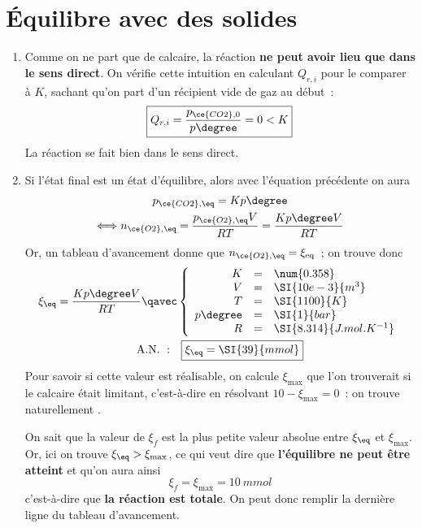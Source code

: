 \documentclass[a4paper, 12pt, final, garamond]{book}
\begin{document}
\section{Équilibre avec des solides}
\begin{enumerate}
    \item Comme on ne part que de calcaire, la réaction \textbf{ne peut avoir
        lieu que dans le sens direct}. On vérifie cette intuition en calculant
        $Q_{r,i}$ pour le comparer à $K$, sachant qu'on part d'un récipient vide
        de gaz au début~:
        \[\boxed{Q_{r,i} = \frac{p_{\ce{CO2}, 0}}{p\degree} = 0 < K}\]
        La réaction se fait bien dans le sens direct.
    \item Si l'état final est un état d'équilibre, alors avec l'équation
        précédente on aura
        \begin{gather*}
            p_{\ce{CO2}, \eq}
                = Kp\degree\\
            \Longleftrightarrow
            n_{\ce{O2}, \eq}
                = \frac{p_{\ce{O2},\eq}V}{RT}
                = \frac{Kp\degree V}{RT}
        \end{gather*}
        Or, un tableau d'avancement donne que $n_{\ce{O2}, \eq} = \xi_{\rm
        eq}$~; on trouve donc
        \begin{gather*}
            \xi_{\eq} = \frac{Kp\degree V}{RT}
            \qavec
            \left\{
                \begin{array}{rcl}
                    K & = & \num{0.358}\\
                    V & = & \SI{10e-3}{m^3}\\
                    T & = & \SI{1100}{K}\\
                    p\degree & = & \SI{1}{bar}\\
                    R & = & \SI{8.314}{J.mol.K^{-1}}
                \end{array}
            \right.\\
            \mathrm{A.N.~:}\quad
            \boxed{\xi_{\eq} = \SI{39}{mmol}}
        \end{gather*}
        Pour savoir si cette valeur est réalisable, on calcule $\xi_{\max}$ que
        l'on trouverait si le calcaire était limitant, c'est-à-dire en résolvant
        $\num{10} - \xi_{\max} = 0$~: on trouve naturellement .\bigbreak

        On sait que la valeur de $\xi_f$ est la plus petite valeur absolue entre
        $\xi_{\eq}$ et $\xi_{\max}$. Or, ici on trouve $\xi_{\eq} >
        \xi_{\max}$, ce qui veut dire que \textbf{l'équilibre ne peut être
        atteint} et qu'on aura ainsi
        \[\boxed{\xi_f = \xi_{\max} = \SI{10}{mmol}}\]
        c'est-à-dire que \textbf{la réaction est totale}. On peut donc remplir
        la dernière ligne du tableau d'avancement.
\end{enumerate}
\end{document}
